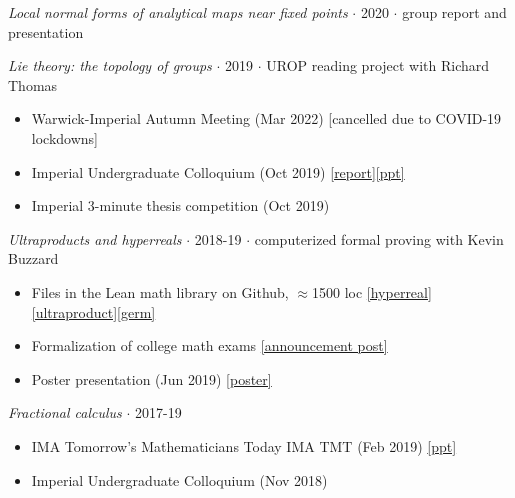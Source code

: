 \documentclass{article}
\newcommand{\archive}{\color{lightgray}}
\begin{document}
\begin{itemize}
    \item \emph{Local normal forms of analytical maps near fixed points} $\cdot$ 2020 $\cdot$ group report and presentation
    
    \item \emph{Lie theory: the topology of groups} $\cdot$ 2019 $\cdot$ UROP reading project with Richard Thomas

    \begin{itemize}
        \item Warwick-Imperial Autumn Meeting (Mar 2022) [cancelled due to COVID-19 lockdowns] 
        \item Imperial Undergraduate Colloquium (Oct 2019) \href{https://drive.google.com/file/d/1F5ZrQmRhkpp7dWFbjHreB-4pX4uR80VX/view?usp=drive_link}{[report]}\href{https://drive.google.com/file/d/1BYsFoRl5F6DBN7ARMdc-I1TrIKJgMqgY/view?usp=drive_link}{[ppt]}
        \item Imperial 3-minute thesis competition (Oct 2019)
    \end{itemize}

    \item \emph{Ultraproducts and hyperreals} $\cdot$ 2018-19 $\cdot$ computerized formal proving with Kevin Buzzard

    \begin{itemize}
        \item Files in the Lean math library on Github, $\approx$1500 loc \href{https://github.com/leanprover-community/mathlib/blob/master/src/data/real/hyperreal.lean}{[hyperreal]}\href{https://github.com/leanprover-community/mathlib/blob/master/src/order/filter/filter_product.lean}{[ultraproduct]}\href{https://github.com/leanprover-community/mathlib/blob/master/src/order/filter/germ.lean}{[germ]}
        \item Formalization of college math exams \href{https://xenaproject.wordpress.com/2019/05/06/m1f-imperial-undergraduates-and-lean/}{[announcement post]}
        \item Poster presentation (Jun 2019) \href{https://drive.google.com/file/d/1FAx-c7pPaaKvjInDIQGr_gnhEnofc_vJ/view?usp=drive_link}{[poster]}
    \end{itemize}

{\archive

    \item \emph{Fractional calculus} $\cdot$ 2017-19

    \begin{itemize}
        \item IMA Tomorrow's Mathematicians Today IMA TMT (Feb 2019) \href{https://drive.google.com/file/d/1F7MZwoudGuYQT7NqGVbvqIsA-073VCpj/view?usp=drive_link}{[ppt]}
        \item Imperial Undergraduate Colloquium (Nov 2018)
    \end{itemize}

}
\end{itemize}
\end{document}
